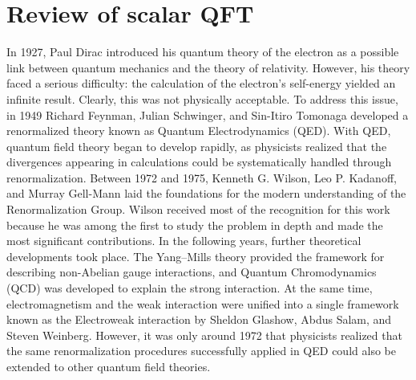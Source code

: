 \chapter{Review of scalar QFT}
In 1927, Paul Dirac introduced his quantum theory of the electron as a possible link between quantum mechanics and the theory of relativity. However, his theory faced a serious difficulty: the calculation of the electron’s self-energy yielded an infinite result. Clearly, this was not physically acceptable. To address this issue, in 1949 Richard Feynman, Julian Schwinger, and Sin-Itiro Tomonaga developed a renormalized theory known as Quantum Electrodynamics (QED). With QED, quantum field theory began to develop rapidly, as physicists realized that the divergences appearing in calculations could be systematically handled through renormalization. Between 1972 and 1975, Kenneth G. Wilson, Leo P. Kadanoff, and Murray Gell-Mann laid the foundations for the modern understanding of the Renormalization Group. Wilson received most of the recognition for this work because he was among the first to study the problem in depth and made the most significant contributions. In the following years, further theoretical developments took place. The Yang–Mills theory provided the framework for describing non-Abelian gauge interactions, and Quantum Chromodynamics (QCD) was developed to explain the strong interaction. At the same time, electromagnetism and the weak interaction were unified into a single framework known as the Electroweak interaction by Sheldon Glashow, Abdus Salam, and Steven Weinberg. However, it was only around 1972 that physicists realized that the same renormalization procedures successfully applied in QED could also be extended to other quantum field theories.

